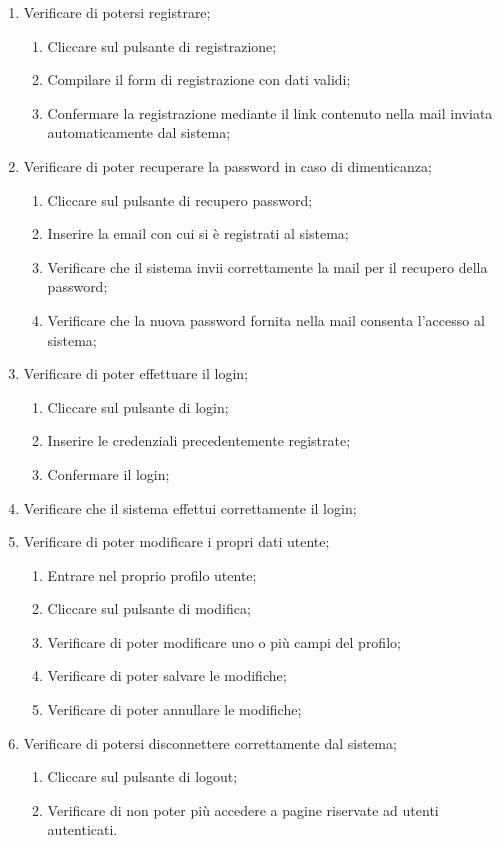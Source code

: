 \begin{enumerate}
\item Verificare di potersi registrare;
\begin{enumerate}
\item Cliccare sul pulsante di registrazione;
\item Compilare il form di registrazione con dati validi;
\item Confermare la registrazione mediante il link contenuto nella mail inviata automaticamente dal sistema;
\end{enumerate}
\item Verificare di poter recuperare la password in caso di dimenticanza;
\begin{enumerate}
\item Cliccare sul pulsante di recupero password;
\item Inserire la email con cui si è registrati al sistema;
\item Verificare che il sistema invii correttamente la mail per il recupero della password;
\item Verificare che la nuova password fornita nella mail consenta l'accesso al sistema;
\end{enumerate}
\item Verificare di poter effettuare il login;
\begin{enumerate}
\item Cliccare sul pulsante di login;
\item Inserire le credenziali precedentemente registrate;
\item Confermare il login;
\end{enumerate}
\item Verificare che il sistema effettui correttamente il login;
\item Verificare di poter modificare i propri dati utente;
\begin{enumerate}
\item Entrare nel proprio profilo utente;
\item Cliccare sul pulsante di modifica;
\item Verificare di poter modificare uno o più campi del profilo;
\item Verificare di poter salvare le modifiche;
\item Verificare di poter annullare le modifiche;
\end{enumerate}
\item Verificare di potersi disconnettere correttamente dal sistema;
\begin{enumerate}
\item Cliccare sul pulsante di logout;
\item Verificare di non poter più accedere a pagine riservate ad utenti autenticati.
\end{enumerate}
\end{enumerate}

